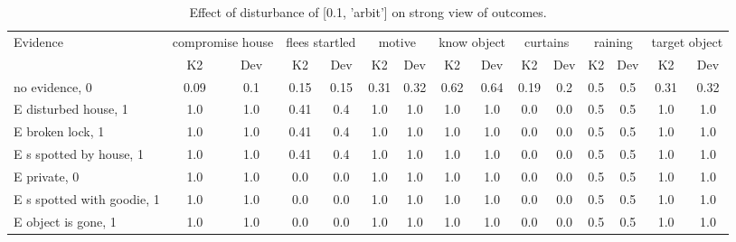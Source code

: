 \begin{table}\begin{tabular}{l|cc|cc|cc|cc|cc|cc|cc}\toprule\multirow{2}{*}{Evidence} & \multicolumn{2}{c}{compromise house}& \multicolumn{2}{c}{flees startled}& \multicolumn{2}{c}{motive}& \multicolumn{2}{c}{know object}& \multicolumn{2}{c}{curtains}& \multicolumn{2}{c}{raining}& \multicolumn{2}{c}{target object}\\& {K2} & {Dev}& {K2} & {Dev}& {K2} & {Dev}& {K2} & {Dev}& {K2} & {Dev}& {K2} & {Dev}& {K2} & {Dev}\\\midrule
no evidence, 0 & 0.09&0.1&0.15&0.15&0.31&0.32&0.62&0.64&0.19&0.2&0.5&0.5&0.31&0.32\\E disturbed house, 1 & 1.0&1.0&0.41&0.4&1.0&1.0&1.0&1.0&0.0&0.0&0.5&0.5&1.0&1.0\\E broken lock, 1 & 1.0&1.0&0.41&0.4&1.0&1.0&1.0&1.0&0.0&0.0&0.5&0.5&1.0&1.0\\E s spotted by house, 1 & 1.0&1.0&0.41&0.4&1.0&1.0&1.0&1.0&0.0&0.0&0.5&0.5&1.0&1.0\\E private, 0 & 1.0&1.0&0.0&0.0&1.0&1.0&1.0&1.0&0.0&0.0&0.5&0.5&1.0&1.0\\E s spotted with goodie, 1 & 1.0&1.0&0.0&0.0&1.0&1.0&1.0&1.0&0.0&0.0&0.5&0.5&1.0&1.0\\E object is gone, 1 & 1.0&1.0&0.0&0.0&1.0&1.0&1.0&1.0&0.0&0.0&0.5&0.5&1.0&1.0\\\bottomrule\end{tabular}\caption{Effect of disturbance of [0.1, 'arbit'] on strong view of outcomes.}\end{table}